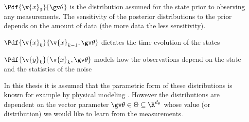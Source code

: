 \begin{description}
\addtolength{\leftskip}{1cm}
	\item[Prior distribution]
	$\Pdf{\v{x}_0}{\Th}$ is the distribution assumed for the state prior to observing any measurements. The
	sensitivity of the posterior distributions to the prior depends on the amount of data (the more data the less sensitivity).
	\item[Dynamic model]
	$\Pdf{\v{x}_k}{\v{x}_{k-1},\Th}$ dictates the time evolution of the states
	\item[Measurement model]
	$\Pdf{\v{y}_k}{\v{x}_{k},\Th}$ models how the observations depend on the state and the statistics of the noise
\end{description}
In this thesis it is assumed that the parametric form of these distributions is known
for example by physical modeling \parencite{ljung1994modeling}. However the distributions are dependent on
the vector parameter $\Th \in \Theta \subseteq \R^{d_\theta}$ whose value (or distribution) we would like to learn from
the measurements.

